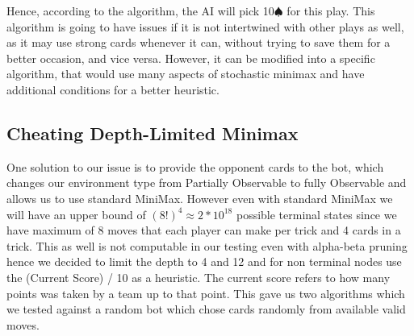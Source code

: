 Hence, according to the algorithm, the AI will pick 10$\spadesuit$ for this play. This algorithm is going to
have issues if it is not intertwined with other plays as well, as it may use strong cards whenever it can, without trying to
save them for a better occasion, and vice versa. However, it can be modified into a specific algorithm, that would
use many aspects of stochastic minimax and have additional conditions for a better heuristic. 

\subsection{Cheating Depth-Limited Minimax}
One solution to our issue is to provide the opponent cards to the bot, which changes our environment type from Partially Observable to fully Observable and allows us to use standard MiniMax.
However even with standard MiniMax we will have an upper bound of $(8!)^4 \approx 2*10^{18}$ possible terminal states since we have maximum of 8 moves that each player can make per trick and 4 cards in a trick.
This as well is not computable in our testing even with alpha-beta pruning hence we decided to limit the depth to 4 and 12 and for non terminal nodes use the (Current Score) / 10 as a heuristic. 
The current score refers to how many points was taken by a team up to that point. This gave us two algorithms which we tested against a random bot which chose cards randomly from available valid moves.
